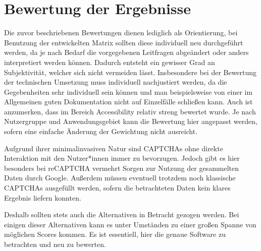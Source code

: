 \chapter{Bewertung der Ergebnisse}
\label{ch:bewertungergebnisse}

Die zuvor beschriebenen Bewertungen dienen lediglich als Orientierung, 
bei Benutzung der entwickelten Matrix sollten diese individuell neu durchgeführt werden,
da je nach Bedarf die vorgegebenen Leitfragen abgeändert oder anders interpretiert werden können.
Dadurch entsteht ein gewisser Grad an Subjektivität, welcher sich nicht vermeiden lässt.
Insbesondere bei der Bewertung der technischen Umsetzung muss individuell nachjustiert werden,
da die Gegebenheiten sehr individuell sein können und man beispielsweise von einer im Allgemeinen 
guten Dokumentation nicht auf Einzelfälle schließen kann.
Auch ist anzumerken, dass im Bereich Accessibility relativ streng bewertet wurde. 
Je nach Nutzergruppe und Anwendungsgebiet kann die Bewertung hier angepasst werden, sofern eine einfache Änderung der Gewichtung nicht ausreicht.

Aufgrund ihrer minimalinvasiven Natur sind CAPTCHAs ohne direkte Interaktion mit den Nutzer*innen immer zu bevorzugen.
Jedoch gibt es hier besonders bei reCAPTCHA vermehrt Sorgen zur Nutzung der gesammelten Daten durch Google. 
Außerdem müssen eventuell trotzdem noch klassische CAPTCHAs ausgefüllt werden, sofern die betrachteten Daten kein klares Ergebnis liefern konnten.

Deshalb sollten stets auch die Alternativen in Betracht gezogen werden. 
Bei einigen dieser Alternativen kann es unter Umständen zu einer großen Spanne von möglichen Scores kommen.
Es ist essentiell, hier die genaue Software zu betrachten und neu zu bewerten. 